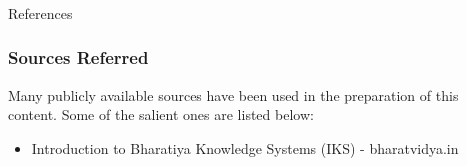 \begin{frame}[fragile]\frametitle{}
\begin{center}
{\Large References}
\end{center}
\end{frame}

\begin{frame}[fragile]\frametitle{Sources Referred}

Many publicly available sources have been used in the preparation of this content. Some of the salient ones are listed below:

	\begin{itemize}
	\item Introduction to Bharatiya Knowledge Systems (IKS) - bharatvidya.in 
	\end{itemize}

\end{frame}